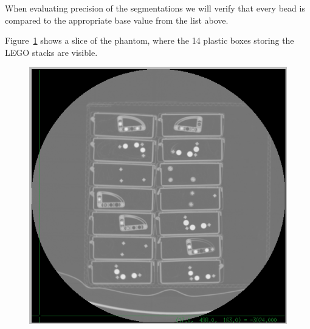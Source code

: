 \documentclass{InsightArticle}
\begin{document}
When evaluating precision of the segmentations we will verify that every bead
is compared to the appropriate base value from the list above.

Figure~\ref{fig:GlobalView} shows a slice of the phantom, where the 14 plastic
boxes storing the LEGO stacks are visible.

\begin{figure}
\center
\includegraphics[width=1.0\textwidth]{NIST_A.png}
\label{fig:GlobalView}
\end{figure}
\clearpage
\end{document}
